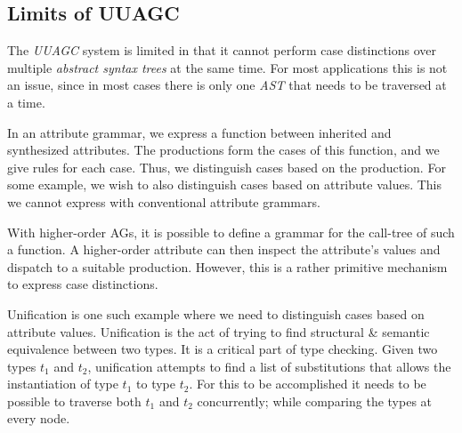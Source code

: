 \documentclass[twoside, titlepage, openright, a4paper]{book}
\begin{document}
\subsection{Limits of UUAGC}
The \emph{UUAGC} system is limited in that it cannot perform case distinctions over multiple \emph{abstract syntax trees} at the same time\cite{visitag}. For most applications this is not an issue, since in most cases there is only one \emph{AST} that needs to be traversed at a time. 

In an attribute grammar, we express a function between inherited and synthesized attributes. The productions form the cases of this function, and we give rules for each case. Thus, we distinguish cases based on the production. For some example, we wish to also distinguish cases based on attribute values. This we cannot express with conventional attribute grammars.

With higher-order AGs, it is possible to define a grammar for the call-tree of such a function. A higher-order attribute can then inspect the attribute's values and dispatch to a suitable production. However, this is a rather primitive mechanism to express case distinctions.

Unification is one such example where we need to distinguish cases based on attribute values. Unification is the act of trying to find structural \& semantic equivalence between two types. It is a critical part of type checking. Given two types \emph{$t_{1}$} and \emph{$t_{2}$}, unification attempts to find a list of substitutions that allows the instantiation of type \emph{$t_{1}$} to type \emph{$t_{2}$}. For this to be accomplished it needs to be possible to traverse both \emph{$t_{1}$} and \emph{$t_{2}$} concurrently; while comparing the types at every node.

%
%    
%
\end{document}
